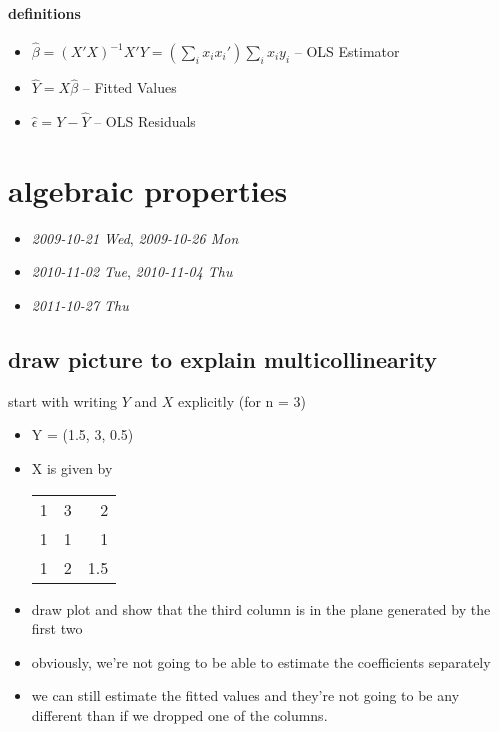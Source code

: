 \paragraph{definitions}
\label{sec-1-2-4}

\begin{itemize}
\item $\hat\beta = (X'X)^{-1}X'Y = \left(\sum_i x_i x_i'\right) \sum_i
        x_i y_i$ -- OLS Estimator
\item $\hat Y = X \hat \beta$ -- Fitted Values
\item $\hat \epsilon = Y - \hat Y$ -- OLS Residuals
\end{itemize}
\section{algebraic properties}
\label{sec-2}

\begin{itemize}
\item \textit{2009-10-21 Wed}, \textit{2009-10-26 Mon}
\item \textit{2010-11-02 Tue}, \textit{2010-11-04 Thu}
\item \textit{2011-10-27 Thu}
\end{itemize}
\subsection{draw picture to explain multicollinearity}
\label{sec-2-1}

     start with writing $Y$ and $X$ explicitly (for n = 3)
\begin{itemize}
\item Y = (1.5, 3, 0.5)
\item X is given by

\begin{center}
\begin{tabular}{rrr}
 1  &  3  &    2  \\
 1  &  1  &    1  \\
 1  &  2  &  1.5  \\
\end{tabular}
\end{center}


\item draw plot and show that the third column is in the plane
       generated by the first two
\item obviously, we're not going to be able to estimate the
       coefficients separately
\item we can still estimate the fitted values and they're not going to
       be any different than if we dropped one of the columns.
\end{itemize}
